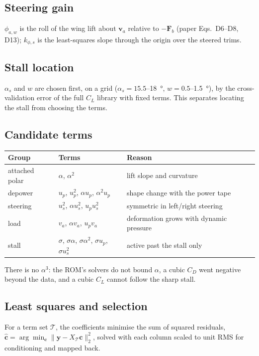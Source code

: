 \documentclass[11pt,a4paper]{article}
\begin{document}
\subsection{Steering gain}
$\phi_{a,w}$ is the roll of the wing lift about $\mathbf v_a$ relative to
$-\mathbf F_b$ (paper Eqs.~D6--D8, D13); $k_{\phi,s}$ is the least-squares slope
through the origin over the \rollN{} steered trims.

\subsection{Stall location}
$\alpha_s$ and $w$ are chosen first, on a grid
($\alpha_s=15.5$--\SI{18}{\degree}, $w=0.5$--\SI{1.5}{\degree}), by the
cross-validation error of the full $C_L$ library with fixed terms. This
separates locating the stall from choosing the terms.

\subsection{Candidate terms}
\begin{center}
\begin{tabular}{lll}
\toprule
Group & Terms & Reason \\
\midrule
attached polar & $\alpha$, $\alpha^2$ & lift slope and curvature \\
depower & $u_p$, $u_p^2$, $\alpha u_p$, $\alpha^2u_p$ & shape change with the power tape \\
steering & $u_s^2$, $\alpha u_s^2$, $u_pu_s^2$ & symmetric in left/right steering \\
load & $v_a$, $\alpha v_a$, $u_pv_a$ & deformation grows with dynamic pressure \\
stall & $\sigma$, $\sigma\alpha$, $\sigma\alpha^2$, $\sigma u_p$, $\sigma u_s^2$ & active past the stall only \\
\bottomrule
\end{tabular}
\end{center}
There is no $\alpha^3$: the ROM's solvers do not bound $\alpha$, a cubic $C_D$
went negative beyond the data, and a cubic $C_L$ cannot follow the sharp stall.

\subsection{Least squares and selection}
For a term set $\mathcal T$, the coefficients minimise the sum of squared
residuals, $\hat{\mathbf c}=\arg\min_{\mathbf c}\lVert\mathbf y-X_\mathcal T\mathbf c\rVert_2^2$,
solved with each column scaled to unit RMS for conditioning and mapped back.
\end{document}
